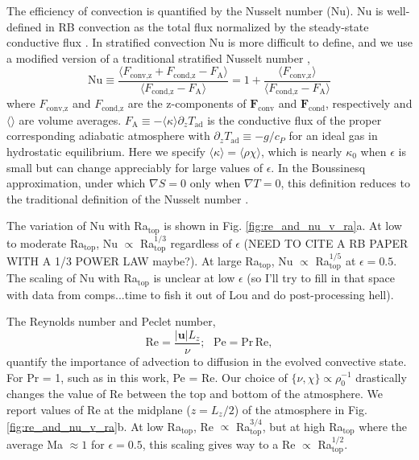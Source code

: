 \documentclass[aps, prl, twocolumn, nofootinbib, groupedaddress, amsfonts, amssymb, amsmath]{revtex4-1}
\newcommand{\grad}{\ensuremath{\nabla}}
\begin{document}
The efficiency of convection is quantified by the Nusselt number (Nu).  
Nu is well-defined in RB convection
as the total flux normalized by the steady-state conductive flux 
\cite{johnston&doering2009, otero&all2002}.
In stratified convection Nu is more difficult to define, and we use
a modified version of a traditional stratified Nusselt number \cite{graham1975,hurlburt&all1984},
\begin{equation}
\text{Nu} \equiv \frac{\langle F_{\text{conv,z}} + F_{\text{cond,z}} - F_{\text{A}}\rangle}
{\langle F_{\text{cond,z}} - F_{\text{A}}\rangle} 
= 1 + \frac{\langle F_{\text{conv,z}}\rangle}{\langle F_{\text{cond,z}} - F_{\text{A}} \rangle}
\label{eqn:nusselt}
\end{equation}
where $F_{\text{conv,z}}$ and $F_{\text{cond,z}}$ are the 
z-components of $\bm{F}_{\text{conv}}$ and $\bm{F}_{\text{cond}}$,
respectively and $\langle \rangle$ are volume averages.  
$F_{\text{A}} \equiv -\langle\kappa\rangle \partial_z T_{\text{ad}}$ 
is the conductive flux of the proper corresponding adiabatic atmosphere
with $\partial_z T_{\text{ad}} \equiv - g / c_{P}$ 
for an ideal gas in hydrostatic equilibrium.  Here we specify
$\langle \kappa \rangle = \langle \rho\chi \rangle$, which is nearly
$\kappa_0$ when $\epsilon$ is small but can change appreciably for large
values of $\epsilon$.
In the Boussinesq approximation, under which $\grad S = 0$ only when 
$\grad T = 0$, this definition reduces to the traditional definition
of the Nusselt number \cite{otero&all2002, johnston&doering2009}.

The variation of Nu with Ra$_{\text{top}}$ is shown in Fig. \ref{fig:re_and_nu_v_ra}a.
At low to moderate Ra$_{\text{top}}$, Nu $\propto$ Ra$_{\text{top}}^{1/3}$ regardless of $\epsilon$ (NEED TO CITE A
RB PAPER WITH A 1/3 POWER LAW \cite{ahlers&all2009} maybe?).  At large Ra$_{\text{top}}$, Nu $\propto$ Ra$_{\text{top}}^{1/5}$ at $\epsilon = 0.5$.
The scaling of Nu with Ra$_{\text{top}}$ is unclear at low $\epsilon$ (so I'll try to fill in that space with
data from comps...time to fish it out of Lou and do post-processing hell).

The Reynolds number and Peclet number,
\begin{equation}
\text{Re} = \frac{|\bm{u}| L_z}{\nu};\,\,\,\,\text{Pe} = \text{Pr}\,\text{Re},
\end{equation}
quantify the importance of advection to diffusion in the evolved
convective state.  For Pr = 1, such as in this work, Pe = Re.  
Our choice of $\{\nu,\chi\}\propto \rho_0^{-1}$ drastically changes
the value of Re between the top and bottom of the atmosphere.  We report values of
Re at the midplane ($z=L_z/2$) of the atmosphere in Fig. \ref{fig:re_and_nu_v_ra}b.
At low Ra$_{\text{top}}$, Re $\propto$ Ra$_{\text{top}}^{3/4}$, but at high Ra$_{\text{top}}$
where the average Ma $\approx 1$ for $\epsilon = 0.5$, this scaling gives way to a Re $\propto$ Ra$_{\text{top}}^{1/2}$.
\end{document}

